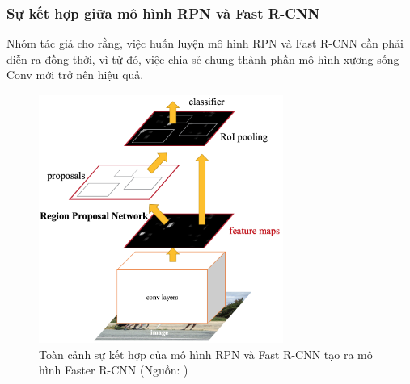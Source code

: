 {    \subsubsection*{Sự kết hợp giữa mô hình RPN và Fast R-CNN}
    Nhóm tác giả cho rằng, việc huấn luyện mô hình RPN và Fast R-CNN cần phải diễn ra đồng thời, vì từ đó, việc chia sẻ chung thành phần mô hình xương sống Conv mới trở nên hiệu quả.

    \begin{figure}[H]
        \centering
        \includegraphics[width=8cm] {images/faster_rcnn_model}
        \caption{Toàn cảnh sự kết hợp của mô hình RPN và Fast R-CNN tạo ra mô hình Faster R-CNN (Nguồn: \cite{ren2015faster})}
        \label{fig:faster_model}
    \end{figure}

}
